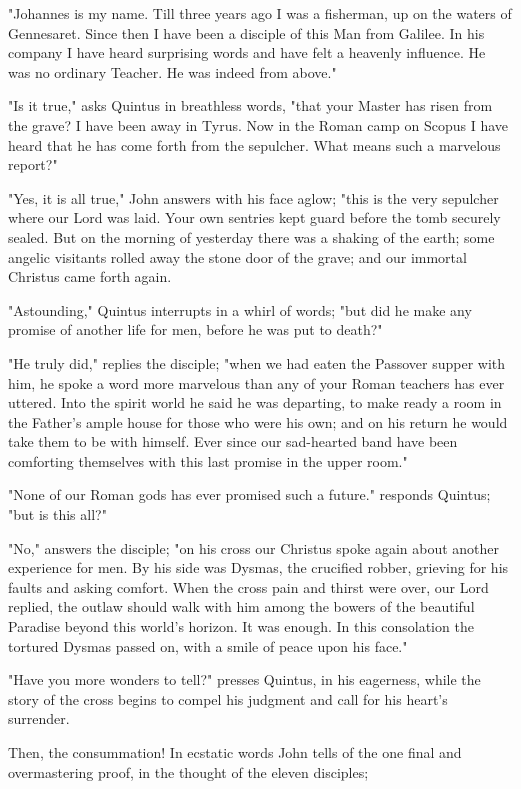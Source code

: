 "Johannes is my name.  Till three years ago I was a fisherman, up
on the waters of Gennesaret.  Since then I have been a disciple of
this Man from Galilee.  In his company I have heard surprising
words and have felt a heavenly influence.  He was no ordinary
Teacher.  He was indeed from above."

"Is it true," asks Quintus in breathless words, "that your Master
has risen from the grave?  I have been away in Tyrus.  Now in the
Roman camp on Scopus I have heard that he has come forth from the
sepulcher.  What means such a marvelous report?"

"Yes, it is all true," John answers with his face aglow; "this is
the very sepulcher where our Lord was laid.  Your own sentries kept
guard before the tomb securely sealed.  But on the morning of
yesterday there was a shaking of the earth; some angelic visitants
rolled away the stone door of the grave; and our immortal Christus
came forth again.

"Astounding," Quintus interrupts in a whirl of words; "but did he
make any promise of another life for men, before he was put to
death?"

"He truly did," replies the disciple; "when we had eaten the
Passover supper with him, he spoke a word more marvelous than any
of your Roman teachers has ever uttered.  Into the spirit world he
said he was departing, to make ready a room in the Father's ample
house for those who were his own; and on his return he would take
them to be with himself.  Ever since our sad-hearted band have been
comforting themselves with this last promise in the upper room."

"None of our Roman gods has ever promised such a future." responds
Quintus; "but is this all?"

"No," answers the disciple; "on his cross our Christus spoke again
about another experience for men.  By his side was Dysmas, the
crucified robber, grieving for his faults and asking comfort.  When
the cross pain and thirst were over, our Lord replied, the outlaw
should walk with him among the bowers of the beautiful Paradise
beyond this world's horizon.  It was enough.  In this consolation
the tortured Dysmas passed on, with a smile of peace upon his face."

"Have you more wonders to tell?" presses Quintus, in his eagerness,
while the story of the cross begins to compel his judgment and call
for his heart's surrender.

Then, the consummation!  In ecstatic words John tells of the one
final and overmastering proof, in the thought of the eleven
disciples;

